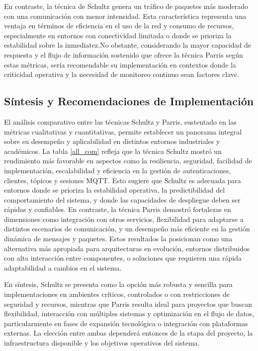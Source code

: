 

En contraste, la técnica de Schultz genera un tráfico de paquetes más moderado con una comunicación con menor intensidad. Esta característica representa una ventaja en términos de eficiencia en el uso de la red y consumo de recursos, especialmente en entornos con conectividad limitada o donde se prioriza la estabilidad sobre la inmediatez.No obstante, considerando la mayor capacidad de respuesta y el flujo de información sostenido que ofrece la técnica Parris según estas métricas, sería recomendable su implementación en contextos donde la criticidad operativa y la necesidad de monitoreo continuo sean factores clave.



\subsection {Síntesis y Recomendaciones de Implementación}

El análisis comparativo entre las técnicas Schultz y Parris, sustentado en las métricas cualitativas y cuantitativas, permite establecer un panorama integral sobre su desempeño y aplicabilidad en distintos entornos industriales y académicos. La tabla \ref{all_com} refleja que la técnica Schultz mostró un rendimiento más favorable en aspectos como la resiliencia, seguridad, facilidad de implementación, escalabilidad y eficiencia en la gestión de autenticaciones, clientes, tópicos y sesiones MQTT. Esto sugiere que Schultz es adecuada para entornos donde se prioriza la estabilidad operativa, la predictibilidad del comportamiento del sistema, y donde las capacidades de despliegue deben ser rápidas y confiables. En contraste, la técnica Parris demostró fortalezas en dimensiones como integración con otros servicios, flexibilidad para adaptarse a distintos escenarios de comunicación, y un desempeño más eficiente en la gestión dinámica de mensajes y paquetes. Estos resultados la posicionan como una alternativa más apropiada para arquitecturas en evolución, entornos distribuidos con alta interacción entre componentes, o soluciones que requieren una rápida adaptabilidad a cambios en el sistema.



En síntesis, Schultz se presenta como la opción más robusta y sencilla para implementaciones en ambientes críticos, controlados o con restricciones de seguridad y recursos, mientras que Parris resulta ideal para proyectos que buscan flexibilidad, interacción con múltiples sistemas y optimización en el flujo de datos, particularmente en fases de expansión tecnológica o integración con plataformas externas. La elección entre ambas dependerá entonces de la etapa del proyecto, la infraestructura disponible y los objetivos operativos del sistema.


